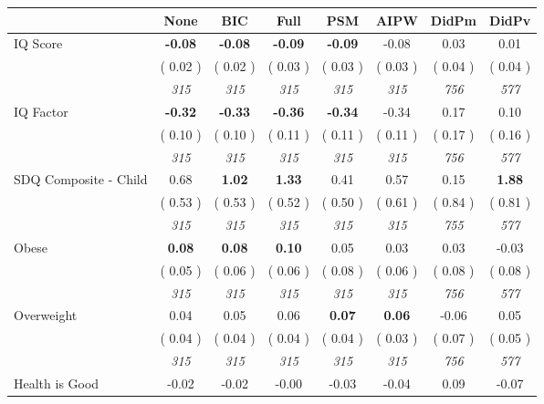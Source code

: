 \begin{tabular}{l c c c c c c c}
\toprule
 & None & BIC & Full & PSM & AIPW & DidPm & DidPv \\
\midrule
IQ Score & \textbf{     -0.08 } & \textbf{     -0.08 } & \textbf{     -0.09 } & \textbf{    -0.09} &     -0.08 &      0.03 &      0.01 \\
& (     0.02 ) & (     0.02 ) & (     0.03 ) & (     0.03 ) & (     0.03 ) & (     0.04 ) & (     0.04 ) \\
& \textit{ 315 } & \textit{ 315 } & \textit{ 315 } & \textit{ 315 } & \textit{ 315 } & \textit{ 756 } & \textit{ 577 } \\
IQ Factor & \textbf{     -0.32 } & \textbf{     -0.33 } & \textbf{     -0.36 } & \textbf{    -0.34} &     -0.34 &      0.17 &      0.10 \\
& (     0.10 ) & (     0.10 ) & (     0.11 ) & (     0.11 ) & (     0.11 ) & (     0.17 ) & (     0.16 ) \\
& \textit{ 315 } & \textit{ 315 } & \textit{ 315 } & \textit{ 315 } & \textit{ 315 } & \textit{ 756 } & \textit{ 577 } \\
SDQ Composite - Child &      0.68 & \textbf{      1.02 } & \textbf{      1.33 } &      0.41 &      0.57 &      0.15 & \textbf{      1.88 } \\
& (     0.53 ) & (     0.53 ) & (     0.52 ) & (     0.50 ) & (     0.61 ) & (     0.84 ) & (     0.81 ) \\
& \textit{ 315 } & \textit{ 315 } & \textit{ 315 } & \textit{ 315 } & \textit{ 315 } & \textit{ 755 } & \textit{ 577 } \\
Obese & \textbf{      0.08 } & \textbf{      0.08 } & \textbf{      0.10 } &      0.05 &      0.03 &      0.03 &     -0.03 \\
& (     0.05 ) & (     0.06 ) & (     0.06 ) & (     0.08 ) & (     0.06 ) & (     0.08 ) & (     0.08 ) \\
& \textit{ 315 } & \textit{ 315 } & \textit{ 315 } & \textit{ 315 } & \textit{ 315 } & \textit{ 756 } & \textit{ 577 } \\
Overweight &      0.04 &      0.05 &      0.06 & \textbf{     0.07} & \textbf{     0.06} &     -0.06 &      0.05 \\
& (     0.04 ) & (     0.04 ) & (     0.04 ) & (     0.04 ) & (     0.03 ) & (     0.07 ) & (     0.05 ) \\
& \textit{ 315 } & \textit{ 315 } & \textit{ 315 } & \textit{ 315 } & \textit{ 315 } & \textit{ 756 } & \textit{ 577 } \\
Health is Good &     -0.02 &     -0.02 &     -0.00 &     -0.03 &     -0.04 &      0.09 &     -0.07 \\

\end{tabular}
